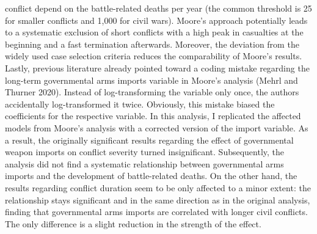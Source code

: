 \documentclass[
]{article}
\begin{document}
conflict depend on the battle-related deaths per year (the common
threshold is 25 for smaller conflicts and 1,000 for civil wars). Moore's
approach potentially leads to a systematic exclusion of short conflicts
with a high peak in casualties at the beginning and a fast termination
afterwards. Moreover, the deviation from the widely used case selection
criteria reduces the comparability of Moore's results. Lastly, previous
literature already pointed toward a coding mistake regarding the
long-term governmental arms imports variable in Moore's analysis (Mehrl
and Thurner 2020). Instead of log-transforming the variable only once,
the authors accidentally log-transformed it twice. Obviously, this
mistake biased the coefficients for the respective variable. In this
analysis, I replicated the affected models from Moore's analysis with a
corrected version of the import variable. As a result, the originally
significant results regarding the effect of governmental weapon imports
on conflict severity turned insignificant. Subsequently, the analysis
did not find a systematic relationship between governmental arms imports
and the development of battle-related deaths. On the other hand, the
results regarding conflict duration seem to be only affected to a minor
extent: the relationship stays significant and in the same direction as
in the original analysis, finding that governmental arms imports are
correlated with longer civil conflicts. The only difference is a slight
reduction in the strength of the effect.
\end{document}
